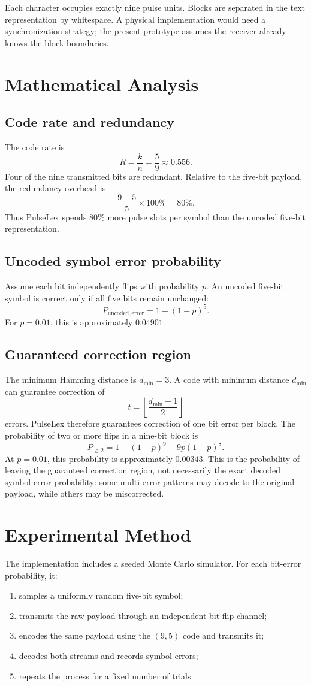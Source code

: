 \documentclass[11pt,a4paper]{article}
\begin{document}
Each character occupies exactly nine pulse units. Blocks are separated in
the text representation by whitespace. A physical implementation would need
a synchronization strategy; the present prototype assumes the receiver
already knows the block boundaries.

\section{Mathematical Analysis}

\subsection{Code rate and redundancy}
The code rate is
\[
  R=\frac{k}{n}=\frac{5}{9}\approx 0.556.
\]
Four of the nine transmitted bits are redundant. Relative to the five-bit
payload, the redundancy overhead is
\[
  \frac{9-5}{5}\times 100\%=80\%.
\]
Thus PulseLex spends 80\% more pulse slots per symbol than the uncoded
five-bit representation.

\subsection{Uncoded symbol error probability}
Assume each bit independently flips with probability $p$. An uncoded
five-bit symbol is correct only if all five bits remain unchanged:
\[
  P_{\mathrm{uncoded,error}}=1-(1-p)^5.
\]
For $p=0.01$, this is approximately $0.04901$.

\subsection{Guaranteed correction region}
The minimum Hamming distance is $d_{\min}=3$. A code with minimum distance
$d_{\min}$ can guarantee correction of
\[
  t=\left\lfloor\frac{d_{\min}-1}{2}\right\rfloor
\]
errors. PulseLex therefore guarantees correction of one bit error per block.
The probability of two or more flips in a nine-bit block is
\[
 P_{\geq 2}=1-(1-p)^9-9p(1-p)^8.
\]
At $p=0.01$, this probability is approximately $0.00343$. This is the
probability of leaving the guaranteed correction region, not necessarily the
exact decoded symbol-error probability: some multi-error patterns may decode
to the original payload, while others may be miscorrected.

\section{Experimental Method}
The implementation includes a seeded Monte Carlo simulator. For each
bit-error probability, it:
\begin{enumerate}
  \item samples a uniformly random five-bit symbol;
  \item transmits the raw payload through an independent bit-flip channel;
  \item encodes the same payload using the $(9,5)$ code and transmits it;
  \item decodes both streams and records symbol errors;
  \item repeats the process for a fixed number of trials.
\end{enumerate}
\end{document}
